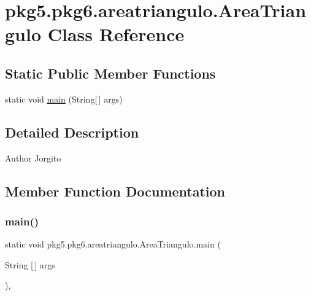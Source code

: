 \hypertarget{classpkg5_1_1pkg6_1_1areatriangulo_1_1_area_triangulo}{}\section{pkg5.\+pkg6.\+areatriangulo.\+Area\+Triangulo Class Reference}
\label{classpkg5_1_1pkg6_1_1areatriangulo_1_1_area_triangulo}
\subsection*{Static Public Member Functions}
\begin{DoxyCompactItemize}
\item 
static void \mbox{\hyperlink{classpkg5_1_1pkg6_1_1areatriangulo_1_1_area_triangulo_a64aa5ea50023df802ff32966833fc5c3}{main}} (String\mbox{[}$\,$\mbox{]} args)
\end{DoxyCompactItemize}


\subsection{Detailed Description}
\begin{DoxyAuthor}{Author}
Jorgito 
\end{DoxyAuthor}


\subsection{Member Function Documentation}
\mbox{\label{classpkg5_1_1pkg6_1_1areatriangulo_1_1_area_triangulo_a64aa5ea50023df802ff32966833fc5c3}} 
\subsubsection{\texorpdfstring{main()}{main()}}
{\footnotesize\ttfamily static void pkg5.\+pkg6.\+areatriangulo.\+Area\+Triangulo.\+main (\begin{DoxyParamCaption}\item[{String \mbox{[}$\,$\mbox{]}}]{args }\end{DoxyParamCaption})\hspace{0.3cm}{\ttfamily [inline]}, {\ttfamily [static]}}


